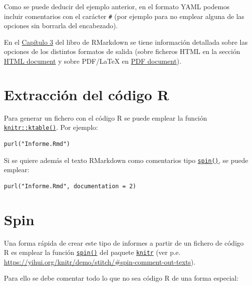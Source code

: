 \documentclass[
]{book}
\theoremstyle{break}
\theoremstyle{nonumberplain}
\begin{document}
Como se puede deducir del ejemplo anterior, en el formato YAML podemos incluir comentarios con el carácter \texttt{\#}
(por ejemplo para no emplear alguna de las opciones sin borrarla del encabezado).

En el \href{https://bookdown.org/yihui/rmarkdown/documents.html}{Capítulo 3} del libro de RMarkdown se tiene información detallada sobre las opciones de los distintos formatos de salida (sobre ficheros HTML en la sección \href{https://bookdown.org/yihui/rmarkdown/html-document.html}{HTML document} y sobre PDF/LaTeX en \href{https://bookdown.org/yihui/rmarkdown/pdf-document.html}{PDF document}).

\hypertarget{extracciuxf3n-del-cuxf3digo-r}{%
\section{Extracción del código R}\label{extracciuxf3n-del-cuxf3digo-r}}

Para generar un fichero con el código R se puede emplear la función \href{NA}{\texttt{knitr::ktable()}}.
Por ejemplo:

\begin{verbatim}
purl("Informe.Rmd")
\end{verbatim}

Si se quiere además el texto RMarkdown como comentarios tipo \href{https://rdrr.io/pkg/knitr/man/spin.html}{\texttt{spin()}}, se puede emplear:

\begin{verbatim}
purl("Informe.Rmd", documentation = 2)
\end{verbatim}

\hypertarget{spin}{%
\section{Spin}\label{spin}}

Una forma rápida de crear este tipo de informes a partir de un fichero de código R es emplear la función \href{https://rdrr.io/pkg/knitr/man/spin.html}{\texttt{spin()}} del paquete \href{https://yihui.org/knitr/}{\texttt{knitr}} (ver p.e. \url{https://yihui.org/knitr/demo/stitch/\#spin-comment-out-texts}).

Para ello se debe comentar todo lo que no sea código R de una forma especial:
\end{document}
